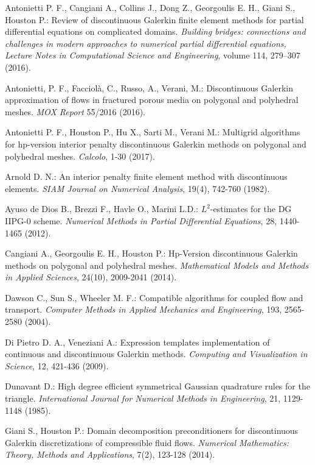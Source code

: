 \documentclass[12pt, a4paper]{article}
\theoremstyle{definition}
\theoremstyle{plain}
\theoremstyle{plain}
\theoremstyle{definition}
\begin{document}
\begin{thebibliography}{99}\label{sec:bib}
	Antonietti P. F., Cangiani  A., Collins J., Dong Z., Georgoulis E. H., Giani S., Houston P.: Review of discontinuous Galerkin finite element methods for partial differential equations on complicated domains. \emph{Building bridges: connections and challenges in modern approaches to numerical partial differential equations, Lecture Notes in Computational Science and Engineering}, volume 114, 279–307 (2016).
	
	Antonietti, P. F., Facciolà, C., Russo, A., Verani, M.: Discontinuous Galerkin approximation of flows in fractured porous media on polygonal and polyhedral meshes. \emph{MOX Report} 55/2016 (2016).
	
	Antonietti P. F., Houston  P., Hu  X., Sarti  M., Verani M.: Multigrid 
	algorithms for hp-version interior penalty discontinuous Galerkin methods 
	on polygonal and polyhedral meshes. \emph{Calcolo}, 1-30 (2017).
	
	Arnold D. N.: An interior penalty finite element method with discontinuous 
	elements. \emph{SIAM Journal on Numerical Analysis}, 19(4), 742-760 (1982).
	
	Ayuso de Dios B., Brezzi F., Havle O., Marini L.D.: $L^2$-estimates for the 
	DG IIPG-0 scheme. \emph{Numerical Methods in Partial Differential 
	Equations}, 28, 1440-1465 (2012).
	
	Cangiani A., Georgoulis E. H., Houston P.: Hp-Version discontinuous 
	Galerkin methods on polygonal and polyhedral meshes. \emph{Mathematical 
	Models and Methods in Applied Sciences}, 24(10), 2009-2041 (2014).
	
	Dawson C., Sun S., Wheeler M. F.: Compatible algorithms for coupled flow 
	and transport. \emph{Computer Methods in Applied Mechanics and 
	Engineering}, 193, 2565-2580 (2004).

	Di Pietro D. A., Veneziani A.: Expression templates implementation of continuous and discontinuous Galerkin methods. \emph{Computing and Visualization in Science}, 12, 421-436 (2009).
	
	Dunavant D.: High degree efficient symmetrical Gaussian quadrature rules 
	for the triangle. \emph{International Journal for Numerical Methods in 
	Engineering}, 21, 1129-1148 (1985).
	
	Giani S., Houston P.: Domain decomposition preconditioners for 
	discontinuous Galerkin discretizations of compressible fluid flows. 
	\emph{Numerical Mathematics: Theory, Methods and Applications}, 7(2), 
	123-128 (2014).
	

\end{thebibliography}
\end{document}
